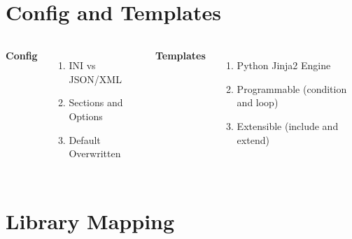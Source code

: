 \documentclass{beamer}
\begin{document}
\section{Config and Templates} %

\begin{frame}
  \begin{columns}[c] %

    \textbf{Config}
    \begin{enumerate}
    \item INI vs JSON/XML
    \item Sections and Options
    \item Default Overwritten
    \end{enumerate}

    \textbf{Templates}
    \begin{enumerate}
    \item Python Jinja2 Engine
    \item Programmable (condition and loop)
    \item Extensible (include and extend)
    \end{enumerate}

  \end{columns}
\end{frame}

\section{Library Mapping} %
\end{document}
